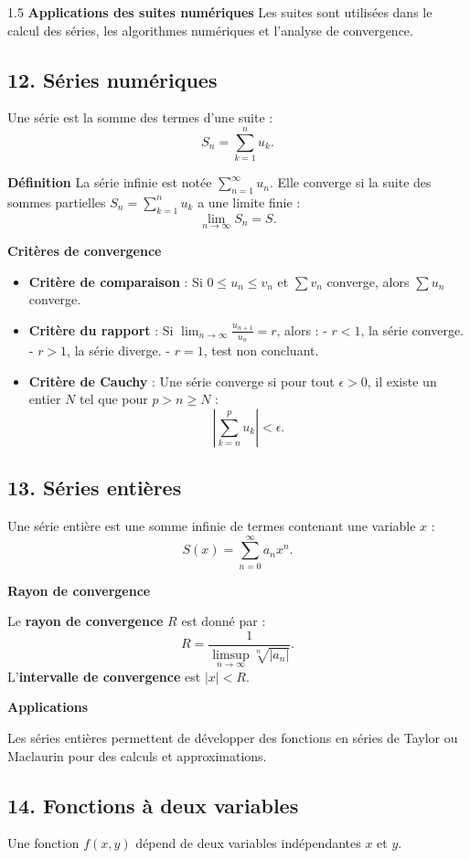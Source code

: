 \documentclass[12pt]{article}
\begin{document}
\begin{spacing}{1.5}
\textbf{Applications des suites numériques}
Les suites sont utilisées dans le calcul des séries, les algorithmes numériques et l'analyse de convergence.

\subsection*{12. Séries numériques}

Une série est la somme des termes d'une suite :  
\[ S_n = \sum_{k=1}^n u_k. \]

\textbf{Définition}
La série infinie est notée \( \sum_{n=1}^\infty u_n \). Elle converge si la suite des sommes partielles \( S_n = \sum_{k=1}^n u_k \) a une limite finie :  
\[ \lim_{n \to \infty} S_n = S. \]

\textbf{Critères de convergence}

\begin{itemize}
    \item \textbf{Critère de comparaison} : Si \( 0 \leq u_n \leq v_n \) et \( \sum v_n \) converge, alors \( \sum u_n \) converge.  
    \item \textbf{Critère du rapport} : Si \( \lim_{n \to \infty} \frac{u_{n+1}}{u_n} = r \), alors :  
    - \( r < 1 \), la série converge.  
    - \( r > 1 \), la série diverge.  
    - \( r = 1 \), test non concluant.  
    \item \textbf{Critère de Cauchy} : Une série converge si pour tout \( \epsilon > 0 \), il existe un entier \( N \) tel que pour \( p > n \geq N \) :  
    \[ \left| \sum_{k=n}^p u_k \right| < \epsilon. \]
\end{itemize}

\subsection*{13. Séries entières}
Une série entière est une somme infinie de termes contenant une variable \( x \) :  
\[ S(x) = \sum_{n=0}^\infty a_n x^n. \]

\textbf{Rayon de convergence}

Le \textbf{rayon de convergence} \( R \) est donné par :  
\[ R = \frac{1}{\limsup_{n \to \infty} \sqrt[n]{|a_n|}}. \]  
L’\textbf{intervalle de convergence} est \( |x| < R \).

\textbf{Applications}

Les séries entières permettent de développer des fonctions en séries de Taylor ou Maclaurin pour des calculs et approximations.

\subsection*{14. Fonctions à deux variables}
Une fonction \( f(x, y) \) dépend de deux variables indépendantes \( x \) et \( y \).


\end{spacing}
\end{document}
